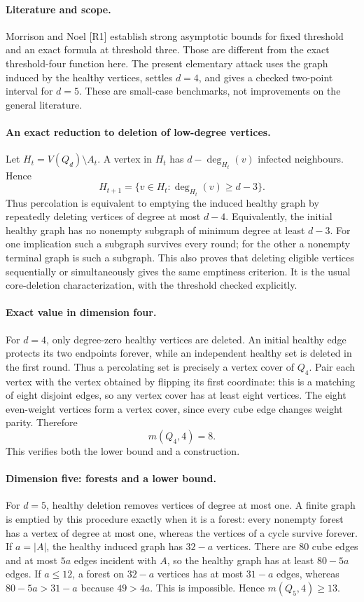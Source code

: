 \documentclass[11pt,a4paper]{article}
\begin{document}
\paragraph{Literature and scope.}
Morrison and Noel [R1] establish strong asymptotic bounds for fixed
threshold and an exact formula at threshold three. Those are different
from the exact threshold-four function here. The present elementary
attack uses the graph induced by the healthy vertices, settles $d=4$,
and gives a checked two-point interval for $d=5$. These are small-case
benchmarks, not improvements on the general literature.

\paragraph{An exact reduction to deletion of low-degree vertices.}
Let $H_t=V(Q_d)\setminus A_t$. A vertex in $H_t$ has
$d-\deg_{H_t}(v)$ infected neighbours. Hence
\[
 H_{t+1}=\{v\in H_t:\deg_{H_t}(v)\ge d-3\}.
\]
Thus percolation is equivalent to emptying the induced healthy graph
by repeatedly deleting vertices of degree at most $d-4$. Equivalently,
the initial healthy graph has no nonempty subgraph of minimum degree
at least $d-3$. For one implication such a subgraph survives every
round; for the other a nonempty terminal graph is such a subgraph.
This also proves that deleting eligible vertices sequentially or
simultaneously gives the same emptiness criterion. It is the usual
core-deletion characterization, with the threshold checked explicitly.

\paragraph{Exact value in dimension four.}
For $d=4$, only degree-zero healthy vertices are deleted. An initial
healthy edge protects its two endpoints forever, while an independent
healthy set is deleted in the first round. Thus a percolating set
is precisely a vertex cover of $Q_4$. Pair each vertex with the
vertex obtained by flipping its first coordinate: this is a matching
of eight disjoint edges, so any vertex cover has at least eight
vertices. The eight even-weight vertices form a vertex cover, since
every cube edge changes weight parity. Therefore
\[
 m(Q_4,4)=8.
\]
This verifies both the lower bound and a construction.

\paragraph{Dimension five: forests and a lower bound.}
For $d=5$, healthy deletion removes vertices of degree at most one.
A finite graph is emptied by this procedure exactly when it is a
forest: every nonempty forest has a vertex of degree at most one,
whereas the vertices of a cycle survive forever. If $a=|A|$, the
healthy induced graph has $32-a$ vertices. There are $80$ cube edges
and at most $5a$ edges incident with $A$, so the healthy graph has
at least $80-5a$ edges. If $a\le12$, a forest on $32-a$ vertices
has at most $31-a$ edges, whereas
$80-5a>31-a$ because $49>4a$. This is impossible. Hence
$m(Q_5,4)\ge13$.
\end{document}
